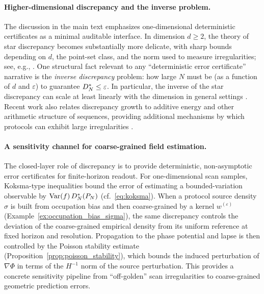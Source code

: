 \paragraph{Higher-dimensional discrepancy and the inverse problem.}
The discussion in the main text emphasizes one-dimensional deterministic certificates as a minimal auditable interface.
In dimension $d\ge 2$, the theory of star discrepancy becomes substantially more delicate, with sharp bounds depending on $d$, the point-set class, and the norm used to measure irregularities; see, e.g., \cite{Matousek1999GeometricDiscrepancy,DickPillichshammer2010DigitalNets}.
One structural fact relevant to any ``deterministic error certificate'' narrative is the \emph{inverse discrepancy} problem: how large $N$ must be (as a function of $d$ and $\varepsilon$) to guarantee $D_N^\ast\le \varepsilon$.
In particular, the inverse of the star discrepancy can scale at least linearly with the dimension in general settings \cite{HeinrichWozniakowskiWasilkowskiNovak2001InverseStarDiscrepancy}.
Recent work also relates discrepancy growth to additive energy and other arithmetic structure of sequences, providing additional mechanisms by which protocols can exhibit large irregularities \cite{AistleitnerLarcher2016AdditiveEnergyIrregularities}.

\paragraph{A sensitivity channel for coarse-grained field estimation.}
The closed-layer role of discrepancy is to provide deterministic, non-asymptotic error certificates for finite-horizon readout.
For one-dimensional scan samples, Koksma-type inequalities bound the error of estimating a bounded-variation observable by $\mathrm{Var}(f)\,D_N^\ast(P_N)$ (cf.\ \eqref{eq:koksma}).
When a protocol source density $\sigma$ is built from occupation bias and then coarse-grained by a kernel $w^{(\varepsilon)}$ (Example~\ref{ex:occupation_bias_sigma}), the same discrepancy controls the deviation of the coarse-grained empirical density from its uniform reference at fixed horizon and resolution.
Propagation to the phase potential and lapse is then controlled by the Poisson stability estimate (Proposition~\ref{prop:poisson_stability}), which bounds the induced perturbation of $\nabla\Phi$ in terms of the $H^{-1}$ norm of the source perturbation.
This provides a concrete sensitivity pipeline from ``off-golden'' scan irregularities to coarse-grained geometric prediction errors.


